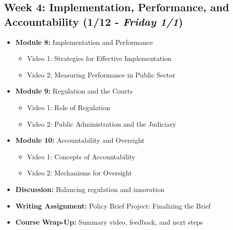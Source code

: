 \documentclass[11pt, letterpaper]{article}
\begin{document}
\subsection*{Week 4: Implementation, Performance, and Accountability (1/12 - \emph{Friday 1/1})}
\begin{itemize}
    \item \textbf{Module 8:} Implementation and Performance
        \begin{itemize}
            \item Video 1: Strategies for Effective Implementation
            \item Video 2: Measuring Performance in Public Sector
        \end{itemize}  
    \item \textbf{Module 9:} Regulation and the Courts
        \begin{itemize}
            \item Video 1: Role of Regulation
            \item Video 2: Public Administration and the Judiciary
        \end{itemize}
    \item \textbf{Module 10:} Accountability and Oversight
        \begin{itemize}
            \item Video 1: Concepts of Accountability
            \item Video 2: Mechanisms for Oversight
        \end{itemize}
    \item \textbf{Discussion:} Balancing regulation and innovation
    \item \textbf{Writing Assignment:} Policy Brief Project: Finalizing the Brief
    \item \textbf{Course Wrap-Up:} Summary video, feedback, and next steps
\end{itemize}
\end{document}
